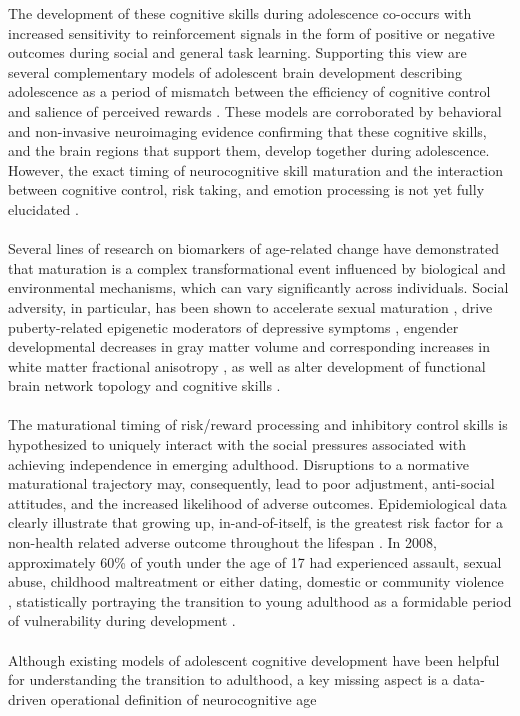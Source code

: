 \documentclass[utf8]{frontiersSCNS} %
\begin{document}
The development of these cognitive skills during adolescence co-occurs with increased sensitivity to reinforcement signals in the form of positive or negative outcomes during social and general task learning. Supporting this view are several complementary models of adolescent brain development describing adolescence as a period of mismatch between the efficiency of cognitive control and salience of perceived rewards \citep{Steinberg2010, CaseyEtAl2008, LunaWright2016, rosenbaum2020valence}. These models are corroborated by behavioral and non-invasive neuroimaging evidence confirming that these cognitive skills, and the brain regions that support them, develop together during adolescence.  However, the exact timing of neurocognitive skill maturation and the interaction between cognitive control, risk taking, and emotion processing is not yet fully elucidated \citep{shulman2016dual, duell2016interaction}.\paragraph*{} Several lines of research on biomarkers of age-related change have demonstrated that maturation is a complex transformational event influenced by biological and environmental mechanisms, which can vary significantly across individuals. Social adversity, in particular, has been shown to accelerate sexual maturation \citep{rickard2014childhood}, drive puberty-related epigenetic moderators of depressive symptoms \citep{sumner2019early}, engender developmental decreases in gray matter volume and corresponding increases in white matter fractional anisotropy \citep{gur2019burden, Gogtay2004}, as well as alter development of functional brain network topology \citep{tooley2020associations} and cognitive skills \citep{mclaughlin2019childhood, belsky2019early}. \paragraph*{} The maturational timing of risk/reward processing and inhibitory control skills is hypothesized to uniquely interact with the social pressures associated with achieving independence in emerging adulthood. Disruptions to a normative maturational trajectory may, consequently, lead to poor adjustment, anti-social attitudes, and the increased likelihood of adverse outcomes. Epidemiological data clearly illustrate that growing up, in-and-of-itself, is the greatest risk factor for a non-health related adverse outcome throughout the lifespan \citep{turner2006effect}. In 2008, approximately 60\% of youth under the age of 17 had experienced assault, sexual abuse, childhood maltreatment or either dating, domestic or community violence \citep{finkelhor2009children}, statistically portraying the transition to young adulthood as a formidable period of vulnerability during development \citep*{berzin2010vulnerability}. \paragraph*{} Although existing models of adolescent cognitive development have been helpful for understanding the transition to adulthood, a key missing aspect is a data-driven operational definition of neurocognitive age 
\end{document}
